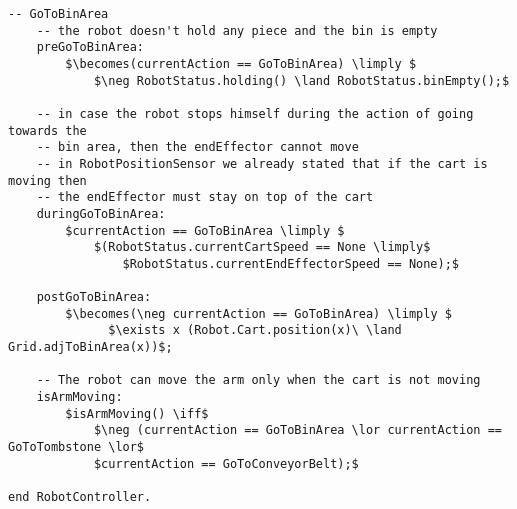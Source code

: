\begin{lstlisting}[fontadjust, mathescape, frame=single]
  -- GoToBinArea
    -- the robot doesn't hold any piece and the bin is empty
    preGoToBinArea:
        $\becomes(currentAction == GoToBinArea) \limply $
            $\neg RobotStatus.holding() \land RobotStatus.binEmpty();$
    
    -- in case the robot stops himself during the action of going towards the 
    -- bin area, then the endEffector cannot move
    -- in RobotPositionSensor we already stated that if the cart is moving then 
    -- the endEffector must stay on top of the cart
    duringGoToBinArea:
        $currentAction == GoToBinArea \limply $
            $(RobotStatus.currentCartSpeed == None \limply$
                $RobotStatus.currentEndEffectorSpeed == None);$

    postGoToBinArea:
        $\becomes(\neg currentAction == GoToBinArea) \limply $
              $\exists x (Robot.Cart.position(x)\ \land Grid.adjToBinArea(x))$;
                      
    -- The robot can move the arm only when the cart is not moving
    isArmMoving: 
        $isArmMoving() \iff$
            $\neg (currentAction == GoToBinArea \lor currentAction == GoToTombstone \lor$
            $currentAction == GoToConveyorBelt);$
         
end RobotController.
\end{lstlisting}


